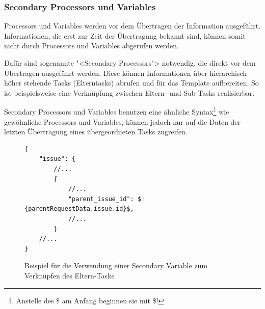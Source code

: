 			
			\subsubsection{Secondary Processors und Variables}
			Processors und Variables werden vor dem Übertragen der Information ausgeführt.
			Informationen, die erst zur Zeit der Übertragung bekannt sind, können somit nicht durch Processors und Variables abgerufen werden.
			
			Dafür sind sogenannte "<Secondary Processors"> notwendig, 
			die direkt vor dem Übertragen ausgeführt werden.
			Diese können Informationen über hierarchisch höher stehende Tasks (Elterntasks)
			abrufen und für das Template aufbereiten. So ist beispielsweise eine Verknüpfung zwischen Eltern- und Sub-Tasks realisierbar.
			
			Secondary Processors und Variables benutzen eine ähnliche Syntax\footnote{Anstelle des \$ am Anfang beginnen sie mit \$!} wie gewöhnliche Processors und Variables, 
			können jedoch nur auf die Daten der letzten Übertragung eines übergeordneten Tasks zugreifen.
			
			\begin{figure}[H]
				\begin{lstlisting}
{
	"issue": {
		//...
		{
			//...
			"parent_issue_id": $!{parentRequestData.issue.id}$,
			//...
		}
	//...
}
				\end{lstlisting}	
				\centering
				\caption{Beispiel für die Verwendung einer Secondary Variable zum Verknüpfen des Eltern-Tasks}
				\label{fig:secondaryProcessors}
			\end{figure}
			
		

